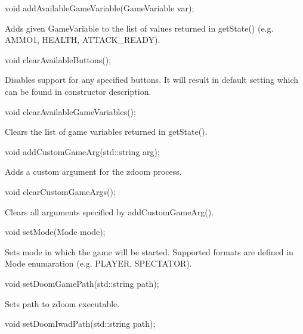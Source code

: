 \vspace{20pt}
\begin{clinee}
void addAvailableGameVariable(GameVariable var);
\end{clinee}

Adds given GameVariable to the list of values returned in getState() (e.g. AMMO1, HEALTH, ATTACK\_READY).


\vspace{20pt}
\begin{clinee}
void clearAvailableButtons();
\end{clinee}

Disables support for any specified buttons. It will result in default setting which can be found in constructor description.


\vspace{20pt}
\begin{clinee}
void clearAvailableGameVariables();
\end{clinee}

Clears the list of game variables returned in getState().


\vspace{20pt}
\begin{clinee}
void addCustomGameArg(std::string arg);
\end{clinee}

Adds a custom argument for the zdoom process. %


\vspace{20pt}
\begin{clinee}
void clearCustomGameArgs();
\end{clinee}

Clears all arguments specified by addCustomGameArg().


\vspace{20pt}
\begin{clinee}
void setMode(Mode mode);
\end{clinee}

Sets mode in which the game will be started. Supported formats are defined in Mode enumaration (e.g. PLAYER, SPECTATOR).


\vspace{20pt}
\begin{clinee}
void setDoomGamePath(std::string path);
\end{clinee}

Sets path to zdoom executable.


\vspace{20pt}
\begin{clinee}
void setDoomIwadPath(std::string path);
\end{clinee}

